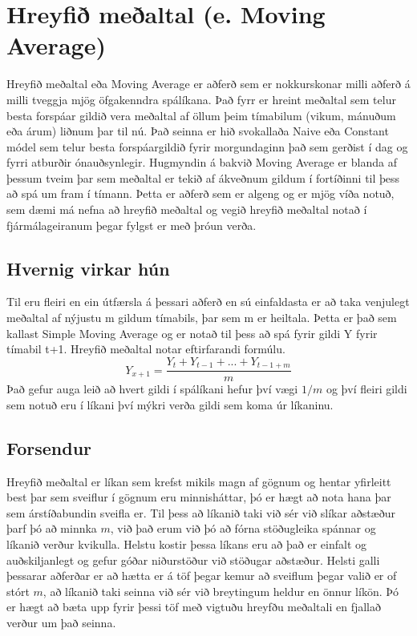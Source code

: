 \section{Hreyfið meðaltal (e. Moving Average)}
Hreyfið meðaltal eða Moving Average \cite{Averagingandsmoothingmodels} er aðferð sem er nokkurskonar milli aðferð á milli tveggja mjög öfgakenndra spálíkana. Það fyrr er hreint meðaltal sem telur besta forspáar gildið vera meðaltal af öllum þeim tímabilum (vikum, mánuðum eða árum) liðnum þar til nú. Það seinna er hið svokallaða Naive eða Constant módel sem telur besta forspáargildið fyrir morgundaginn það sem gerðist í dag og fyrri atburðir ónauðsynlegir. Hugmyndin á bakvið Moving Average er blanda af þessum tveim þar sem meðaltal er tekið af ákveðnum gildum í fortíðinni til þess að spá um fram í tímann. Þetta er aðferð sem er algeng og er mjög víða notuð, sem dæmi má nefna að hreyfið meðaltal og vegið hreyfið meðaltal notað í fjármálageiranum þegar fylgst er með þróun verða.

\subsection{Hvernig virkar hún}
Til eru fleiri en ein útfærsla á þessari aðferð en sú einfaldasta er að taka venjulegt meðaltal af nýjustu m gildum tímabils, þar sem m er heiltala. Þetta er það sem kallast Simple Moving Average og er notað til þess að spá fyrir gildi Y fyrir tímabil t+1. Hreyfið meðaltal notar eftirfarandi formúlu.
$$Y_{x+1} = \frac{Y_t + Y_{t-1} + ... + Y_{t-1+m}}{m}$$
Það gefur auga leið að hvert gildi í spálíkani hefur því vægi $1/m$ og því fleiri gildi sem notuð eru í líkani því mýkri verða gildi sem koma úr líkaninu.


\subsection{Forsendur}
Hreyfið meðaltal er líkan sem krefst mikils magn af gögnum og hentar yfirleitt best þar sem sveiflur í gögnum eru minnisháttar, þó er hægt að nota hana þar sem árstíðabundin sveifla er. Til þess að líkanið taki við sér við slíkar aðstæður þarf þó að minnka $m$, við það erum við þó að fórna stöðugleika spánnar og líkanið verður kvikulla.
Helstu kostir þessa líkans eru að það er einfalt og auðskiljanlegt og gefur góðar niðurstöður við stöðugar aðstæður. Helsti galli þessarar aðferðar er að hætta er á töf þegar kemur að sveiflum þegar valið er of stórt $m$, að líkanið taki seinna við sér við breytingum heldur en önnur líkön. Þó er hægt að bæta upp fyrir þessi töf með vigtuðu hreyfðu meðaltali en fjallað verður um það seinna.